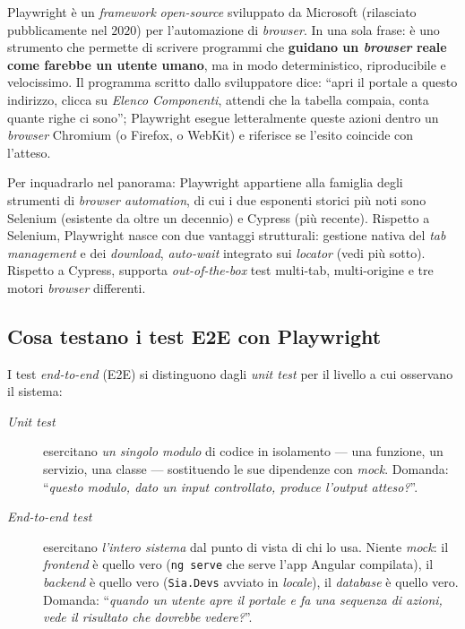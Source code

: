 Playwright è un \emph{framework} \emph{open-source} sviluppato da Microsoft (rilasciato pubblicamente nel $2020$) per l'automazione di \emph{browser}. In una sola frase: è uno strumento che permette di scrivere programmi che \textbf{guidano un \emph{browser} reale come farebbe un utente umano}, ma in modo deterministico, riproducibile e velocissimo. Il programma scritto dallo sviluppatore dice: ``apri il portale a questo indirizzo, clicca su \emph{Elenco Componenti}, attendi che la tabella compaia, conta quante righe ci sono''; Playwright esegue letteralmente queste azioni dentro un \emph{browser} Chromium (o Firefox, o WebKit) e riferisce se l'esito coincide con l'atteso.

Per inquadrarlo nel panorama: Playwright appartiene alla famiglia degli strumenti di \emph{browser automation}, di cui i due esponenti storici più noti sono Selenium (esistente da oltre un decennio) e Cypress (più recente). Rispetto a Selenium, Playwright nasce con due vantaggi strutturali: gestione nativa del \emph{tab management} e dei \emph{download}, \emph{auto-wait} integrato sui \emph{locator} (vedi più sotto). Rispetto a Cypress, supporta \emph{out-of-the-box} test multi-tab, multi-origine e tre motori \emph{browser} differenti.

\subsection{Cosa testano i test E2E con Playwright}

I test \emph{end-to-end} (E2E) si distinguono dagli \emph{unit test} per il livello a cui osservano il sistema:

\begin{description}
    \item[\emph{Unit test}] esercitano \emph{un singolo modulo} di codice in isolamento — una funzione, un servizio, una classe — sostituendo le sue dipendenze con \emph{mock}. Domanda: ``\emph{questo modulo, dato un input controllato, produce l'output atteso?}''.
    \item[\emph{End-to-end test}] esercitano \emph{l'intero sistema} dal punto di vista di chi lo usa. Niente \emph{mock}: il \emph{frontend} è quello vero (\texttt{ng serve} che serve l'app Angular compilata), il \emph{backend} è quello vero (\texttt{Sia.Devs} avviato in \emph{locale}), il \emph{database} è quello vero. Domanda: ``\emph{quando un utente apre il portale e fa una sequenza di azioni, vede il risultato che dovrebbe vedere?}''.
\end{description}

